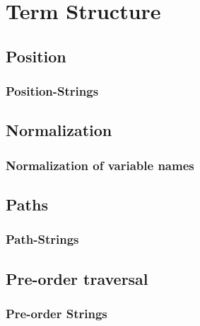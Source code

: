 
\section{Term Structure}

\subsection{Position}
\begin{frame}
	\frametitle{Position-Strings}
	
\end{frame}

\subsection{Normalization}
\begin{frame}
	\frametitle{Normalization of variable names}
	
\end{frame}

\subsection{Paths}
\begin{frame}
	\frametitle{Path-Strings}
	
\end{frame}

\subsection{Pre-order traversal}
\begin{frame}
	\frametitle{Pre-order Strings}
	
\end{frame}

